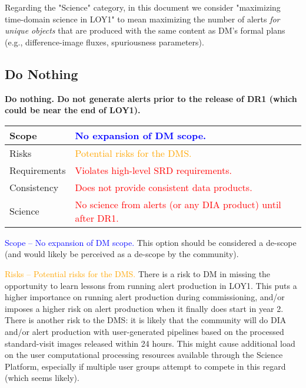 \documentclass[DM,lsstdraft,toc]{lsstdoc}
\begin{document}
Regarding the "Science" category, in this document we consider "maximizing time-domain science in LOY1" to mean maximizing the number of alerts {\em for unique objects} that are produced with the same content as DM's formal plans (e.g., difference-image fluxes, spuriousness parameters). 



\clearpage
\subsection{Do Nothing}\label{ssec:potsol_donothing}

{\bf Do nothing. Do not generate alerts prior to the release of DR1 (which could be near the end of LOY1).}

\begin{center}
\begin{tabular}{|p{2.5cm}|p{13cm}|}
\hline
Scope & \textcolor{blue}{No expansion of DM scope.} \\
\hline
Risks & \textcolor{orange}{Potential risks for the DMS.} \\
\hline
Requirements & \textcolor{red}{Violates high-level SRD requirements.} \\
\hline
Consistency & \textcolor{red}{Does not provide consistent data products.} \\
\hline
Science & \textcolor{red}{No science from alerts (or any DIA product) until after DR1.} \\
\hline
\end{tabular}
\end{center}

\textcolor{blue}{ Scope -- No expansion of DM scope.} This option should be considered a de-scope (and would likely be perceived as a de-scope by the community).

\textcolor{orange}{ Risks -- Potential risks for the DMS.} There is a risk to DM in missing the opportunity to learn lessons from running alert production in LOY1. This puts a higher importance on running alert production during commissioning, and/or imposes a higher risk on alert production when it finally does start in year 2. There is another risk to the DMS: it is likely that the community will do DIA and/or alert production with user-generated pipelines based on the processed standard-visit images released within 24 hours. This might cause additional load on the user computational processing resources available through the Science Platform, especially if multiple user groups attempt to compete in this regard (which seems likely).
\end{document}

